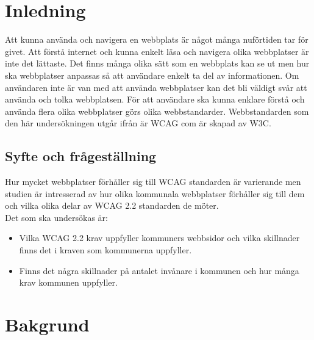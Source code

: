 \documentclass[11p]{article}
\begin{document}
    \begin{otherlanguage}{swedish}
    \newpage
    \tableofcontents
    \newpage

    \section{Inledning} %
    Att kunna använda och navigera en webbplats är något många nuförtiden tar för givet.
    Att förstå internet och kunna enkelt läsa och navigera olika webbplatser är inte det lättaste.
    Det finns många olika sätt som en webbplats kan se ut men hur ska webbplatser anpassas så att användare enkelt ta del av informationen.
    Om användaren inte är van med att använda webbplatser kan det bli väldigt svår att använda och tolka webbplatsen.
    För att användare ska kunna enklare förstå och använda flera olika webbplatser görs olika webbstandarder.
    Webbstandarden som den här undersökningen utgår ifrån är WCAG com är skapad av W3C.

    
    \subsection{Syfte och frågeställning}
    Hur mycket webbplatser förhåller sig till WCAG standarden är varierande men studien är intresserad av hur olika kommunala webbplatser förhåller sig till dem och vilka olika delar av WCAG 2.2 standarden de möter.
    \\Det som ska undersökas är:
    \begin{itemize}
        \item Vilka WCAG 2.2 krav uppfyller kommuners webbsidor och vilka skillnader finns det i kraven som kommunerna uppfyller.
        \item Finns det några skillnader på antalet invånare i kommunen och hur många krav kommunen uppfyller.
    \end{itemize}

    \section{Bakgrund}


\end{otherlanguage}
\end{document}
